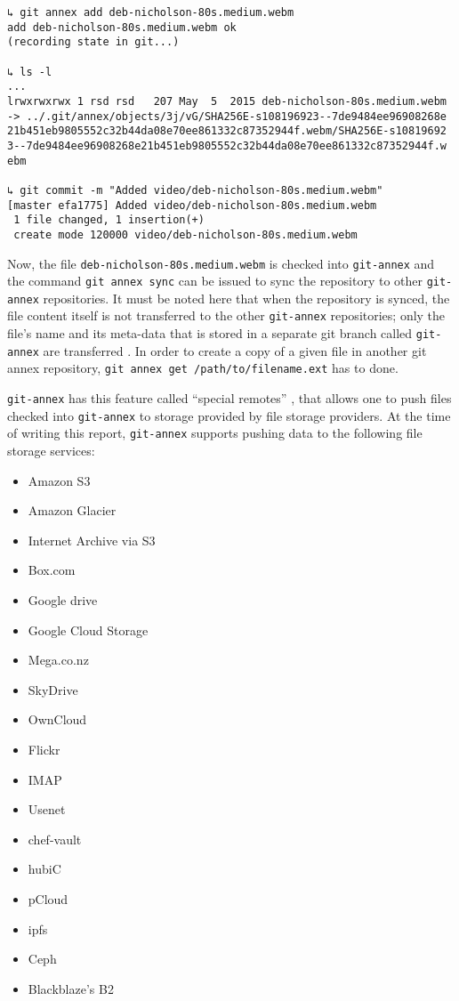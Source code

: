 {\small
\begin{verbatim}
↳ git annex add deb-nicholson-80s.medium.webm
add deb-nicholson-80s.medium.webm ok
(recording state in git...)

↳ ls -l
...
lrwxrwxrwx 1 rsd rsd   207 May  5  2015 deb-nicholson-80s.medium.webm
-> ../.git/annex/objects/3j/vG/SHA256E-s108196923--7de9484ee96908268e
21b451eb9805552c32b44da08e70ee861332c87352944f.webm/SHA256E-s10819692
3--7de9484ee96908268e21b451eb9805552c32b44da08e70ee861332c87352944f.w
ebm

↳ git commit -m "Added video/deb-nicholson-80s.medium.webm"
[master efa1775] Added video/deb-nicholson-80s.medium.webm
 1 file changed, 1 insertion(+)
 create mode 120000 video/deb-nicholson-80s.medium.webm
\end{verbatim}
}

Now, the file \verb+deb-nicholson-80s.medium.webm+ is checked into
\verb+git-annex+ and the command \verb+git annex sync+ can be issued
to sync the repository to other \verb+git-annex+ repositories. It must
be noted here that when the repository is synced, the file content
itself is not transferred to the other \verb+git-annex+ repositories;
only the file's name and its meta-data that is stored in a separate
git branch called \verb+git-annex+ are transferred
\cite{documentation:git-annex-hworks}. In order to create a copy of a
given file in another git annex repository,
\verb+git annex get /path/to/filename.ext+ has to done.

\verb+git-annex+ has this feature called ``special remotes''
\cite{documentation:git-annex-sremotes}, that allows one to push files
checked into \verb+git-annex+ to storage provided by file storage
providers. At the time of writing this report, \verb+git-annex+
supports pushing data to the following file storage services:

{\scriptsize
  \begin{itemize}
  \item Amazon S3
  \item Amazon Glacier
  \item Internet Archive via S3
  \item Box.com
  \item Google drive
  \item Google Cloud Storage
  \item Mega.co.nz
  \item SkyDrive
  \item OwnCloud
  \item Flickr
  \item IMAP
  \item Usenet
  \item chef-vault
  \item hubiC
  \item pCloud
  \item ipfs
  \item Ceph
  \item Blackblaze's B2
  \end{itemize}
}

